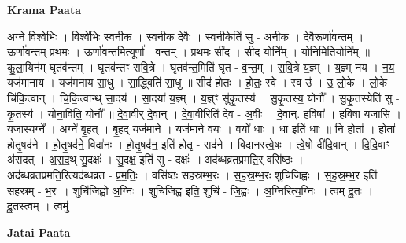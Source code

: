\documentclass[17pt]{extarticle}
\begin{document}
\textbf{Krama Paata} \newline

अग्ने॒ विश्वे॑भिः । विश्वे॑भिः स्वनीक । स्व॒नी॒क॒ दे॒वैः । स्व॒नी॒केति॑ सु - अ॒नी॒क॒ । दे॒वैरूर्णा॑वन्तम् । ऊर्णा॑वन्तम् प्रथ॒मः । ऊर्णा॑वन्त॒मित्यूर्णा᳚ - व॒न्त॒म् । प्र॒थ॒मः सी॑द । सी॒द॒ योनि᳚म् । योनि॒मिति॒योनि᳚म् ॥ कु॒ला॒यिन॑म् घृ॒तव॑न्तम् । घृ॒तव॑न्तꣳ सवि॒त्रे । घृ॒तव॑न्त॒मिति॑ घृ॒त - व॒न्त॒म् । स॒वि॒त्रे य॒ज्ञ्म् । य॒ज्ञ्म् न॑य । न॒य॒ यज॑मानाय । यज॑मनाय सा॒धु । सा॒द्ध्विति॑ सा॒धु ॥ सीद॑ होतः । हो॒तः॒ स्वे । स्व उ॑ । उ॒ लो॒के । लो॒के चि॑कि॒त्वान् । चि॒कि॒त्वान्थ् सा॒दय॑ । सा॒दया॑ य॒ज्ञ्म् । य॒ज्ञ्ꣳ सु॑कृ॒तस्य॑ । सु॒कृ॒तस्य॒ योनौ᳚ । सु॒कृ॒तस्येति॑ सु - कृ॒तस्य॑ । योना॒विति॒ योनौ᳚ ॥ दे॒वा॒वीर् दे॒वान् । दे॒वा॒वीरिति॑ देव - अ॒वीः । दे॒वान्. ह॒विषा᳚ । ह॒विषा॑ यजासि । य॒जा॒स्यग्ने᳚ । अग्ने॑ बृ॒हत् । बृ॒हद् यज॑माने । यज॑माने॒ वयः॑ । वयो॑ धाः । धा॒ इति॑ धाः ॥ नि होता᳚ । होता॑ होतृ॒षद॑ने । हो॒तृ॒षद॑ने॒ विदा॑नः । हो॒तृ॒षद॑न॒ इति॑ होतृ - सद॑ने । विदा॑नस्त्वे॒षः । त्वे॒षो दी॑दि॒वान् । दि॒दि॒वाꣳ अ॑सदत् । अ॒स॒द॒थ् सु॒दक्षः॑ । सु॒दक्ष॒ इति॑ सु - दक्षः॑ ॥ अद॑ब्धव्रतप्रमति॒र् वसि॑ष्ठः । अद॑ब्धव्रतप्रमति॒रित्यद॑ब्धव्रत - प्र॒म॒तिः॒ । वसि॑ष्ठः सहस्रम्भ॒रः । स॒ह॒स्र॒म्भ॒रः शुचि॑जिह्वः । स॒ह॒स्र॒म्भ॒र इति॑ सहस्रम् - भ॒रः । शुचि॑जिह्वो अ॒ग्निः । शुचि॑जिह्व॒ इति॒ शुचि॑ - जि॒ह्वः॒ । अ॒ग्निरित्य॒ग्निः ॥ त्वम् दू॒तः । दू॒तस्त्वम् । त्वमु॑ \newline

\textbf{Jatai Paata} \newline
\end{document}
